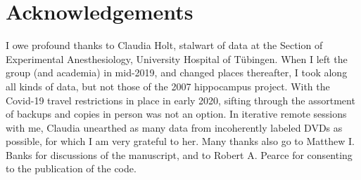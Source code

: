 \section{Acknowledgements}
I owe profound thanks to Claudia Holt, stalwart of data at the Section of Experimental Anesthesiology, University Hospital of Tübingen. When I left the group (and academia) in mid-2019, and changed places thereafter, I took along all kinds of data, but not those of the 2007 hippocampus project. With the Covid-19 travel restrictions in place in early 2020, sifting through the assortment of backups and copies in person was not an option. In iterative remote sessions with me, Claudia unearthed as many data from incoherently labeled DVDs as possible, for which I am very grateful to her. Many thanks also go to Matthew I. Banks for discussions of the manuscript, and to Robert A. Pearce for consenting to the publication of the code.